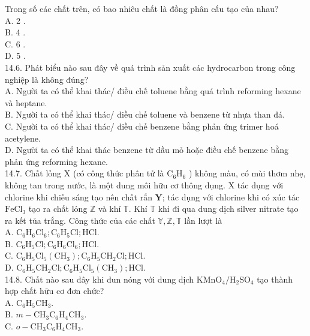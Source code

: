 \documentclass[10pt]{article}
\begin{document}
Trong số các chất trên, có bao nhiêu chất là đồng phân cấu tạo của nhau?\\
A. 2 .\\
B. 4 .\\
C. 6 .\\
D. 5 .\\
14.6. Phát biểu nào sau đây về quá trình sản xuất các hydrocarbon trong công nghiệp là không đúng?\\
A. Người ta có thể khai thác/ điều chế toluene bằng quá trình reforming hexane và heptane.\\
B. Người ta có thể khai thác/ điều chế toluene và benzene từ nhựa than đá.\\
C. Người ta có thể khai thác/ điều chế benzene bằng phản ứng trimer hoá acetylene.\\
D. Người ta có thể khai thác benzene từ dầu mỏ hoặc điều chế benzene bằng phản ứng reforming hexane.\\
14.7. Chất lỏng X (có công thức phân tử là $\mathrm{C}_{6} \mathrm{H}_{6}$ ) không màu, có mùi thơm nhẹ, không tan trong nước, là một dung môi hữu cơ thông dụng. X tác dụng với chlorine khi chiếu sáng tạo nên chất rắn $\mathbf{Y}$; tác dụng với chlorine khi có xúc tác $\mathrm{FeCl}_{3}$ tạo ra chất lỏng $\mathbb{Z}$ và khí $\mathbb{T}$. Khí $\mathbb{T}$ khi đi qua dung dịch silver nitrate tạo ra kết tủa trắng. Công thức của các chất $\mathbb{Y}, \mathbb{Z}, \mathbb{T}$ lần lượt là\\
A. $\mathrm{C}_{6} \mathrm{H}_{6} \mathrm{Cl}_{6} ; \mathrm{C}_{6} \mathrm{H}_{5} \mathrm{Cl} ; \mathrm{HCl}$.\\
B. $\mathrm{C}_{6} \mathrm{H}_{5} \mathrm{Cl} ; \mathrm{C}_{6} \mathrm{H}_{6} \mathrm{Cl}_{6} ; \mathrm{HCl}$.\\
C. $\mathrm{C}_{6} \mathrm{H}_{5} \mathrm{Cl}_{5}\left(\mathrm{CH}_{3}\right) ; \mathrm{C}_{6} \mathrm{H}_{5} \mathrm{CH}_{2} \mathrm{Cl} ; \mathrm{HCl}$.\\
D. $\mathrm{C}_{6} \mathrm{H}_{5} \mathrm{CH}_{2} \mathrm{Cl} ; \mathrm{C}_{6} \mathrm{H}_{5} \mathrm{Cl}_{5}\left(\mathrm{CH}_{3}\right) ; \mathrm{HCl}$.\\
14.8. Chất nào sau đây khi đun nóng với dung dịch $\mathrm{KMnO}_{4} / \mathrm{H}_{2} \mathrm{SO}_{4}$ tạo thành hợp chất hữu cơ đơn chức?\\
A. $\mathrm{C}_{6} \mathrm{H}_{5} \mathrm{CH}_{3}$.\\
B. $m-\mathrm{CH}_{3} \mathrm{C}_{6} \mathrm{H}_{4} \mathrm{CH}_{3}$.\\
C. $o-\mathrm{CH}_{3} \mathrm{C}_{6} \mathrm{H}_{4} \mathrm{CH}_{3}$.\\
\end{document}
